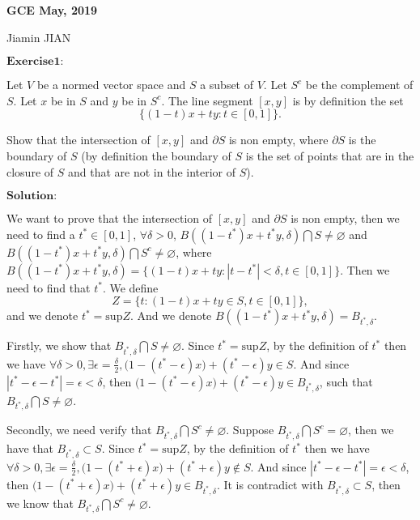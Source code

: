 \documentclass[12pt,a4paper]{ctexart}
\begin{document}
\begin{center}
\textbf{ GCE May, 2019}
\vspace{8pt}

Jiamin JIAN
\end{center}

\vspace{12pt}

$\textbf{Exercise1:}$

Let $V$ be a normed vector space and $S$ a subset of $V$. Let $S^{c}$ be the complement of $S$. Let $x$ be in $S$ and $y$ be in $S^{c}$. The line segment $[x, y]$ is by definition the set
\begin{equation*}
    \{(1-t)x + t y : t \in [0, 1] \}.
\end{equation*}

Show that the intersection of $[x, y]$ and $\partial S$ is non empty, where $\partial S$ is the boundary of $S$ (by definition the boundary of $S$ is the set of points that are in the closure of $S$ and that are not in the interior of $S$).

\vspace{8pt}
$\textbf{Solution:}$

We want to prove that the intersection of $[x, y]$ and $\partial S$ is non empty, then we need to find a $t^{*} \in [0, 1]$, $\forall \delta >0$, $B((1-t^{*})x + t^{*}y, \delta) \bigcap S \neq \varnothing$ and $B((1-t^{*})x + t^{*}y, \delta) \bigcap S^{c} \neq \varnothing$, where $B((1-t^{*})x + t^{*}y, \delta) = \{(1-t)x + t y: |t - t^{*} | < \delta, t \in [0, 1] \}.$ Then we need to find that $t^{*}$. We define
\begin{equation*}
    Z = \{t: (1-t) x + t y \in S, t \in [0,1]\},
\end{equation*}
and we denote $t^{*} = \text{sup} {Z}$. And we denote $B((1-t^{*})x + t^{*}y, \delta) = B_{t^{*}, \delta}$. 

Firstly, we show that $B_{t^{*}, \delta} \bigcap S \neq \varnothing$. Since $t^{*} = \text{sup} Z$, by the definition of $t^{*}$ then we have $\forall \delta > 0, \exists \epsilon = \frac{\delta}{2}, \big(1 - (t^{*} - \epsilon)x \big) + (t^{*} - \epsilon) y \in S$. And since $|t^{*} - \epsilon - t^{*}| = \epsilon < \delta$, then $\big(1 - (t^{*} - \epsilon)x \big) + (t^{*} - \epsilon) y \in B_{t^{*}, \delta}$, such that $B_{t^{*}, \delta} \bigcap S \neq \varnothing$.

Secondly, we need verify that $B_{t^{*}, \delta} \bigcap S^{c} \neq \varnothing$. Suppose $B_{t^{*}, \delta} \bigcap S^{c} = \varnothing$, then we have that $B_{t^{*}, \delta} \subset S$. Since $t^{*} = \text{sup} Z$, by the definition of $t^{*}$ then we have $\forall \delta > 0, \exists \epsilon = \frac{\delta}{2}, \big(1 - (t^{*} + \epsilon)x \big) + (t^{*} + \epsilon) y \notin S$. And since $|t^{*} - \epsilon - t^{*}| = \epsilon < \delta$, then $\big(1 - (t^{*} + \epsilon)x \big) + (t^{*} + \epsilon) y \in B_{t^{*}, \delta}$. It is contradict with $B_{t^{*}, \delta} \subset S$, then we know that $B_{t^{*}, \delta} \bigcap S^{c} \neq \varnothing$.
\end{document}
